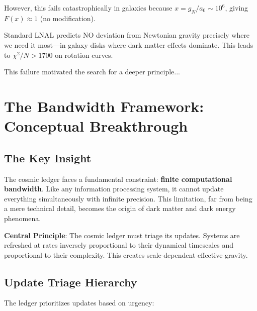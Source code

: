 \documentclass[12pt,letterpaper]{article}
\newcommand{\chisq}{\chi^2}
\begin{document}
However, this fails catastrophically in galaxies because $x = g_N/a_0 \sim 10^6$, giving $F(x) \approx 1$ (no modification).

\begin{tcolorbox}[colback=red!5, colframe=red!50!black, title=The Fatal Flaw]
Standard LNAL predicts NO deviation from Newtonian gravity precisely where we need it most—in galaxy disks where dark matter effects dominate. This leads to $\chisq/N > 1700$ on rotation curves.
\end{tcolorbox}

This failure motivated the search for a deeper principle...

\newpage

\section{The Bandwidth Framework: Conceptual Breakthrough}

\subsection{The Key Insight}

The cosmic ledger faces a fundamental constraint: \textbf{finite computational bandwidth}. Like any information processing system, it cannot update everything simultaneously with infinite precision. This limitation, far from being a mere technical detail, becomes the origin of dark matter and dark energy phenomena.

\begin{tcolorbox}[keyresult]
\textbf{Central Principle}: The cosmic ledger must triage its updates. Systems are refreshed at rates inversely proportional to their dynamical timescales and proportional to their complexity. This creates scale-dependent effective gravity.
\end{tcolorbox}

\subsection{Update Triage Hierarchy}

The ledger prioritizes updates based on urgency:
\end{document}
